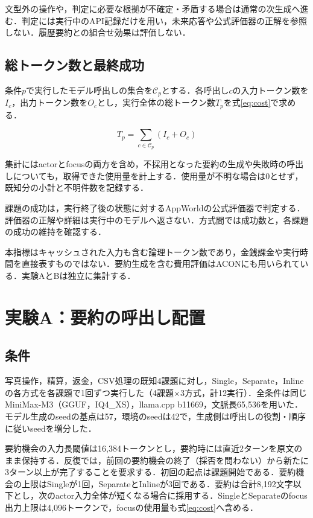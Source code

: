 \documentclass[letter]{ieicej}
\begin{document}
文型外の操作や，判定に必要な根拠が不確定・矛盾する場合は通常の次生成へ進む．判定には実行中のAPI記録だけを用い，未来応答や公式評価器の正解を参照しない．履歴要約との組合せ効果は評価しない．

\newpage
\begin{samepage}
\subsection{総トークン数と最終成功}

条件$p$で実行したモデル呼出しの集合を$\mathcal C_p$とする．各呼出し$c$の入力トークン数を$I_c$，出力トークン数を$O_c$とし，実行全体の総トークン数$T_p$を\mbox{式\eqref{eq:cost}で求める．}

\begin{equation}
 T_p=\sum_{c\in\mathcal C_p}(I_c+O_c)
 \label{eq:cost}
\end{equation}

集計にはactorとfocusの両方を含め，不採用となった要約の生成や失敗時の呼出しについても，取得できた使用量を計上する．使用量が不明な場合は0とせず，既知分の小計と不明件数を記録する．
\end{samepage}

課題の成功は，実行終了後の状態に対するAppWorld\cite{trivedi2024appworld}の公式評価器で判定する．評価器の正解や詳細は実行中のモデルへ返さない．方式間では成功数と，各課題の成功の維持を確認する．

本指標はキャッシュされた入力も含む論理トークン数であり，金銭課金や実行時間を直接表すものではない\cite{xu2026tokenpilot}．要約生成を含む費用評価はACON\cite{kang2026acon}にも用いられている．実験AとBは独立に集計する．

\section{実験A：要約の呼出し配置}

\subsection{条件}

写真操作，精算，返金，CSV処理の既知4課題に対し，Single，Separate，Inlineの各方式を各課題で1回ずつ実行した（4課題×3方式，計12実行）．全条件は同じMiniMax-M3（GGUF，IQ4\_XS），llama.cpp b11669，文脈長65,536を用いた．モデル生成のseedの基点は57，環境のseedは42で，生成側は呼出しの役割・順序に従いseedを増分した．

要約機会の入力長閾値は16,384トークンとし，要約時には直近2ターンを原文のまま保持する．反復では，前回の要約機会の終了（採否を問わない）から新たに3ターン以上が完了することを要求する．初回の起点は課題開始である．要約機会の上限はSingleが1回，SeparateとInlineが3回である．要約は合計8,192文字以下とし，次のactor入力全体が短くなる場合に採用する．SingleとSeparateのfocus出力上限は4,096トークンで，focusの使用量も式\eqref{eq:cost}へ含める．
\end{document}
